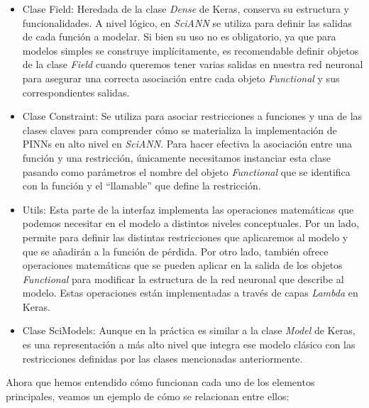 \begin{itemize}
    \item Clase Field: Heredada de la clase \textit{Dense} de Keras, conserva su estructura y funcionalidades. A nivel lógico, en \textit{SciANN} se utiliza para definir las salidas de cada función a modelar. Si bien su uso no es obligatorio, ya que para modelos simples se construye implícitamente, es recomendable definir objetos de la clase \textit{Field} cuando queremos tener varias salidas en nuestra red neuronal para asegurar una correcta asociación entre cada objeto \textit{Functional} y sus correspondientes salidas. 

    \item Clase Constraint: Se utiliza para asociar restricciones a funciones y una de las clases claves para comprender cómo se materializa la implementación de PINNs en alto nivel en \textit{SciANN}. Para hacer efectiva la asociación entre una función y una restricción, únicamente necesitamos instanciar esta clase pasando como parámetros el nombre del objeto \textit{Functional} que se identifica con la función y el ``llamable'' que define la restricción.
    
    \item Utils: Esta parte de la interfaz implementa las operaciones matemáticas que podemos necesitar en el modelo a distintos niveles conceptuales. Por un lado, permite para definir las distintas restricciones que aplicaremos al modelo y que se añadirán a la función de pérdida. Por otro lado, también ofrece operaciones matemáticas que se pueden aplicar en la salida de los objetos \textit{Functional} para modificar la estructura de la red neuronal que describe al modelo. Estas operaciones están implementadas a través de capas \textit{Lambda} en Keras. 

    \item Clase SciModels: Aunque en la práctica es similar a la clase \textit{Model} de Keras, es una representación a más alto nivel que integra ese modelo clásico con las restricciones definidas por las clases mencionadas anteriormente. 
    


\end{itemize}
    Ahora que hemos entendido cómo funcionan cada uno de los elementos principales, veamos un ejemplo de cómo se relacionan entre ellos:  
